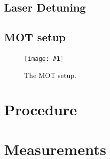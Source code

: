 \documentclass[twocolumn]{article}
\newcommand{\insertFigure}[1]{%
   \texttt{[image: \#1]}%
}
\begin{document}
\subsection{Laser Detuning}

\subsection{MOT setup}
\begin{figure} [!h]
	\centering
	\insertFigure{Images/MOT.png}
	\caption{The MOT setup.\cite{manual}}
	\label{fig:MOT}
\end{figure}

\section{Procedure} \label{sec:Proc}

\section{Measurements}
\end{document}
